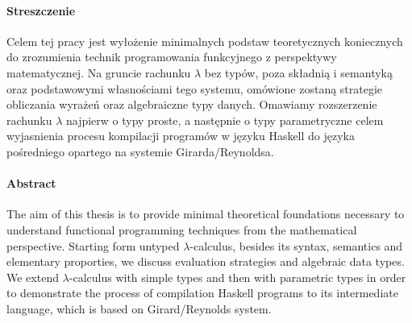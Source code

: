 \paragraph{Streszczenie}
Celem tej pracy jest wyłożenie minimalnych podstaw teoretycznych
koniecznych do zrozumienia technik programowania funkcyjnego
z perspektywy matematycznej. Na gruncie rachunku \(\lambda\) bez typów,
poza składnią i semantyką oraz podstawowymi własnościami tego systemu,
omówione zostaną strategie obliczania wyrażeń oraz algebraiczne
typy danych. Omawiamy rozszerzenie rachunku \(\lambda\)  najpierw o typy proste,
a następnie o typy parametryczne celem wyjasnienia procesu kompilacji
programów w języku Haskell do języka pośredniego opartego na 
systemie Girarda/Reynoldsa.

\paragraph{Abstract}
The aim of this thesis is to provide minimal theoretical foundations
necessary to understand functional programming techniques from the
mathematical perspective. Starting form untyped \(\lambda\)-calculus,
besides its syntax, semantics and elementary proporties, we discuss
evaluation strategies and algebraic data types. We extend \(\lambda\)-calculus
with simple types and then with parametric types in order to demonstrate
the process of compilation Haskell programs to its intermediate language,
which is based on Girard/Reynolds system.
